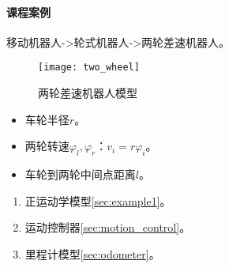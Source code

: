 \documentclass[
12pt, %
a4paper, 
oneside, %
headinclude,footinclude, %
]{scrartcl}
\begin{document}
\paragraph{课程案例}\label{sec:two_wheel}
移动机器人->轮式机器人->两轮差速机器人。

\noindent
\begin{minipage}{0.3\textwidth}
\begin{figure}[H]
\centering
\texttt{[image: two\_wheel]} 
\caption{两轮差速机器人模型}
\end{figure}
\end{minipage}
\begin{minipage}{0.4\textwidth}
\begin{itemize}
\item 车轮半径$ r $。
\item 两轮转速$ \varphi_l,\varphi_r $：$ v_i = r\varphi_i $。
\item 车轮到两轮中间点距离$ l $。
\end{itemize}
\end{minipage}
\begin{minipage}{0.3\textwidth}
\begin{enumerate}
\item 正运动学模型\ref{sec:example1}。
\item 运动控制器\ref{sec:motion_control}。
\item 里程计模型\ref{sec:odometer}。
\end{enumerate}
\end{minipage}
\end{document}
